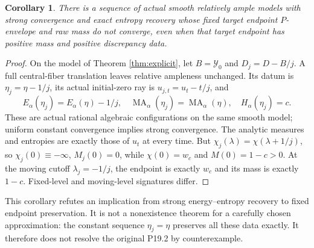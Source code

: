 \documentclass[11pt]{article}
\newcommand{\MA}{\operatorname{MA}}
\newtheorem{corollary}[theorem]{Corollary}
\theoremstyle{remark}\newtheorem{remark}[theorem]{Remark}
\begin{document}
\begin{corollary}\label{cor:endpoint}
There is a sequence of actual smooth relatively ample models with
strong convergence and exact entropy recovery whose fixed target
endpoint $P$-envelope and raw mass do not converge, even when that
target endpoint has positive mass and positive discrepancy data.
\end{corollary}
\begin{proof}
On the model of Theorem \ref{thm:explicit}, let $B=\mathcal Y_0$ and
$D_j=D-B/j$. A full central-fiber translation leaves relative
ampleness unchanged. Its datum is $\eta_j=\eta-1/j$, its actual
initial-zero ray is $u_{j,t}=u_t-t/j$, and
\[
 E_\alpha(\eta_j)=E_\alpha(\eta)-1/j,\quad
 \MA_\alpha(\eta_j)=\MA_\alpha(\eta),\quad
 H_\alpha(\eta_j)=c.
\]
These are actual rational algebraic configurations on the same smooth
model; uniform constant convergence implies strong convergence.
The analytic measures and entropies are exactly those of $u_t$ at
every time. But $\chi_j(\lambda)=\chi(\lambda+1/j)$, so
$\chi_j(0)\equiv-\infty$, $M_j(0)=0$, while
$\chi(0)=w_c$ and $M(0)=1-c>0$. At the moving cutoff
$\lambda_j=-1/j$, the endpoint is exactly $w_c$ and its mass is
exactly $1-c$. Fixed-level and moving-level signatures differ.
\end{proof}
This corollary refutes an implication from strong energy--entropy
recovery to fixed endpoint preservation. It is not a nonexistence
theorem for a carefully chosen approximation: the constant sequence
$\eta_j=\eta$ preserves all these data exactly. It therefore does
not resolve the original P19.2 by counterexample.
\end{document}
